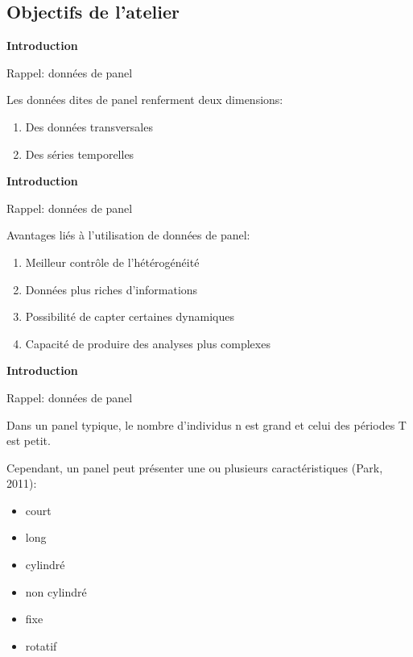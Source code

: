 \documentclass{beamer}
\begin{document}
\subsection{Objectifs de l'atelier}
\begin{frame}{\textbf{Introduction}}
\begin{block}{Rappel: donn\'ees de panel}
\end{block}
Les donn\'ees dites de panel renferment deux dimensions: 
\begin{enumerate}
\item Des donn\'ees transversales
\item Des s\'eries temporelles
\end{enumerate}
\end{frame}
\begin{frame}{\textbf{Introduction}}
\begin{block}{Rappel: donn\'ees de panel}
\end{block}
Avantages li\'es  \`a l'utilisation de donn\'ees de panel:
\begin{enumerate}
\item Meilleur contr\^ole de l'h\'et\'erog\'en\'eit\'e
\item Donn\'ees plus riches d'informations 
\item Possibilit\'e de capter certaines dynamiques 
\item Capacit\'e de produire des analyses plus complexes 
\end{enumerate}
\end{frame}
\begin{frame}{\textbf{Introduction}}
\begin{block}{Rappel: donn\'ees de panel}
\end{block}
Dans un panel typique, le nombre d'individus n est grand et celui des
p\'eriodes T est petit. \newline

Cependant, un panel peut pr\'esenter une ou plusieurs caract\'eristiques (Park, 2011): 
\begin{itemize}
\item court 
\item long 
\item cylindr\'e
\item non cylindr\'e 
\item fixe 
\item rotatif 
\end{itemize}
\end{frame}
\end{document}
